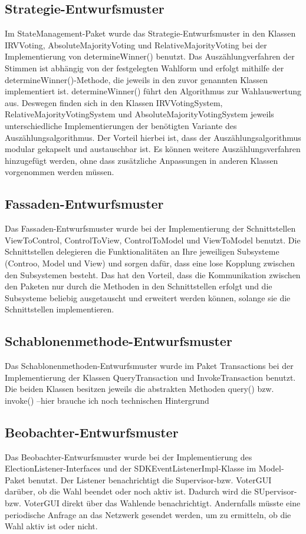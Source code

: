 \documentclass[parskip=full]{scrartcl}
\begin{document}
\subsection{Strategie-Entwurfsmuster}
Im StateManagement-Paket wurde das Strategie-Entwurfsmuster in den Klassen IRVVoting, AbsoluteMajorityVoting und RelativeMajorityVoting bei der Implementierung von determineWinner() benutzt.
Das Auszählungverfahren der Stimmen ist abhängig von der festgelegten Wahlform und erfolgt mithilfe der determineWinner()-Methode, die jeweils in den zuvor genannten Klassen implementiert ist.
determineWinner() führt den Algorithmus zur Wahlauswertung aus. Deswegen finden sich in den Klassen IRVVotingSystem, RelativeMajorityVotingSystem und AbsoluteMajorityVotingSystem jeweils unterschiedliche Implementierungen der benötigten Variante des Auszählungsalgorithmus.
Der Vorteil hierbei ist, dass der Auszählungsalgorithmus modular gekapselt und austauschbar ist. Es können weitere Auszählungsverfahren hinzugefügt werden, ohne dass zusätzliche Anpassungen in anderen Klassen vorgenommen werden müssen.

\subsection{Fassaden-Entwurfsmuster}
Das Fassaden-Entwurfsmuster wurde bei der Implementierung der Schnittstellen ViewToControl, ControlToView, ControlToModel und ViewToModel benutzt. Die Schnittstellen delegieren die Funktionalitäten an Ihre jeweiligen Subsysteme (Controo, Model und View) und sorgen dafür, dass eine lose Kopplung zwischen den Subsystemen besteht.
Das hat den Vorteil, dass die Kommunikation zwischen den Paketen nur durch die Methoden in den Schnittstellen erfolgt und die Subsysteme beliebig ausgetauscht und erweitert werden können, solange sie die Schnittstellen implementieren.

\subsection{Schablonenmethode-Entwurfsmuster}
Das Schablonenmethoden-Entwurfsmuster wurde im Paket Transactions bei der Implementierung der Klassen QueryTransaction und InvokeTransaction benutzt.
Die beiden Klassen besitzen jeweils die abstrakten Methoden query() bzw. invoke() --hier brauche ich noch technischen Hintergrund

\subsection{Beobachter-Entwurfsmuster}
Das Beobachter-Entwurfsmuster wurde bei der Implementierung des ElectionListener-Interfaces und der SDKEventListenerImpl-Klasse im Model-Paket benutzt. Der Listener benachrichtigt die Supervisor-bzw. VoterGUI darüber, ob die Wahl beendet oder noch aktiv ist. Dadurch wird die SUpervisor- bzw. VoterGUI direkt über das Wahlende benachrichtigt. Andernfalls müsste eine periodische Anfrage an das Netzwerk gesendet werden, um zu ermitteln, ob die Wahl aktiv ist oder nicht. 
\end{document}
